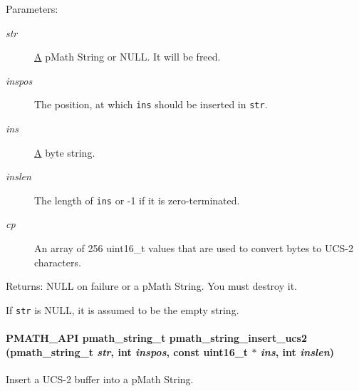 \begin{Desc}
\item[Parameters:]
\begin{description}
\item[{\em str}]\hyperlink{class_a}{A} pMath String or NULL. It will be freed. \item[{\em inspos}]The position, at which {\tt ins} should be inserted in {\tt str}. \item[{\em ins}]\hyperlink{class_a}{A} byte string. \item[{\em inslen}]The length of {\tt ins} or -1 if it is zero-terminated. \item[{\em cp}]An array of 256 uint16\_\-t values that are used to convert bytes to UCS-2 characters. \end{description}
\end{Desc}
\begin{Desc}
\item[Returns:]NULL on failure or a pMath String. You must destroy it.\end{Desc}
If {\tt str} is NULL, it is assumed to be the empty string. \hypertarget{group__strings_ge49ea36d0f35856b6b9aeb0c4470c614}{
\paragraph[{pmath\_\-string\_\-insert\_\-ucs2}]{\setlength{\rightskip}{0pt plus 5cm}PMATH\_\-API {\bf pmath\_\-string\_\-t} pmath\_\-string\_\-insert\_\-ucs2 ({\bf pmath\_\-string\_\-t} {\em str}, \/  int {\em inspos}, \/  const uint16\_\-t $\ast$ {\em ins}, \/  int {\em inslen})}\hfill}
\label{group__strings_ge49ea36d0f35856b6b9aeb0c4470c614}


Insert a UCS-2 buffer into a pMath String. 

